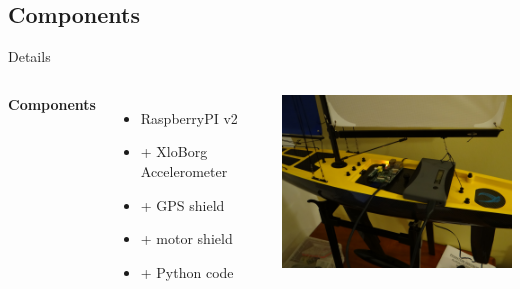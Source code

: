 \documentclass[aspectratio=169,unknownkeysallowed,xcolor=dvipsnames,beamer]{beamer} %
\begin{document}
\subsection{Components}
\begin{frame}[fragile]{Details}
\begin{columns}
\textbf{Components}
\vspace{5mm}
\begin{itemize}
 \item RaspberryPI v2
 \item + XloBorg Accelerometer
 \item + GPS shield
 \item + motor shield
 \item + Python code
\end{itemize}
\begin{center}
 \includegraphics[width=8cm]{sailbot000}
\end{center}
\end{columns}
\end{frame}

{
\begin{frame}[plain]
\end{frame}}
\end{document}
